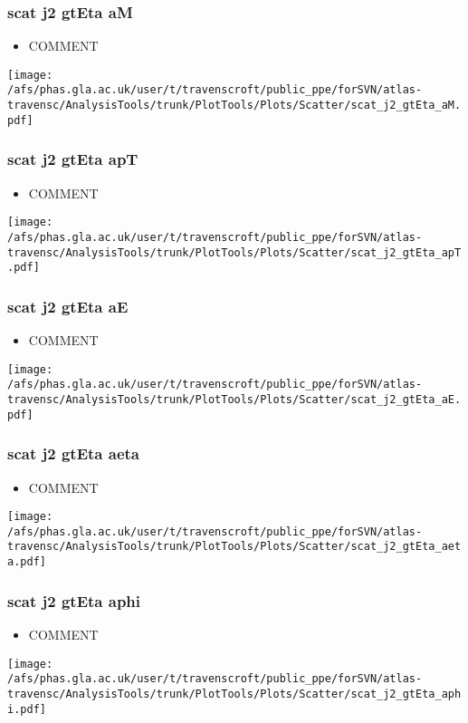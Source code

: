 \documentclass{beamer}
\begin{document}
\begin{frame}
\frametitle{scat j2 gtEta aM}
\begin{itemize}
\item COMMENT
\end{itemize}
\begin{center}
\texttt{[image: /afs/phas.gla.ac.uk/user/t/travenscroft/public\_ppe/forSVN/atlas-travensc/AnalysisTools/trunk/PlotTools/Plots/Scatter/scat\_j2\_gtEta\_aM.pdf]}
\end{center}
\end{frame}

\begin{frame}
\frametitle{scat j2 gtEta apT}
\begin{itemize}
\item COMMENT
\end{itemize}
\begin{center}
\texttt{[image: /afs/phas.gla.ac.uk/user/t/travenscroft/public\_ppe/forSVN/atlas-travensc/AnalysisTools/trunk/PlotTools/Plots/Scatter/scat\_j2\_gtEta\_apT.pdf]}
\end{center}
\end{frame}

\begin{frame}
\frametitle{scat j2 gtEta aE}
\begin{itemize}
\item COMMENT
\end{itemize}
\begin{center}
\texttt{[image: /afs/phas.gla.ac.uk/user/t/travenscroft/public\_ppe/forSVN/atlas-travensc/AnalysisTools/trunk/PlotTools/Plots/Scatter/scat\_j2\_gtEta\_aE.pdf]}
\end{center}
\end{frame}

\begin{frame}
\frametitle{scat j2 gtEta aeta}
\begin{itemize}
\item COMMENT
\end{itemize}
\begin{center}
\texttt{[image: /afs/phas.gla.ac.uk/user/t/travenscroft/public\_ppe/forSVN/atlas-travensc/AnalysisTools/trunk/PlotTools/Plots/Scatter/scat\_j2\_gtEta\_aeta.pdf]}
\end{center}
\end{frame}

\begin{frame}
\frametitle{scat j2 gtEta aphi}
\begin{itemize}
\item COMMENT
\end{itemize}
\begin{center}
\texttt{[image: /afs/phas.gla.ac.uk/user/t/travenscroft/public\_ppe/forSVN/atlas-travensc/AnalysisTools/trunk/PlotTools/Plots/Scatter/scat\_j2\_gtEta\_aphi.pdf]}
\end{center}
\end{frame}
\end{document}
